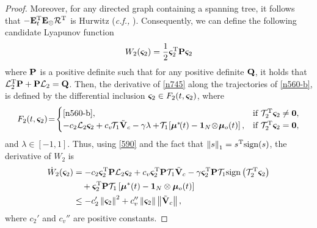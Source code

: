 \begin{proof}
	Moreover, for any directed graph containing a spanning tree, it follows that $-\mathbf{E}_t^{\mathrm{T}} \mathbf{E}_\odot \mathcal{R}^{\mathrm{T}}$ is Hurwitz (\emph{c.f.,} \cite{mukherjee_robustness_2018}).
	Consequently, we can define the following candidate Lyapunov function 
	\begin{equation}\label{n745}
	W_2(\bm{\varsigma}_2)=\frac{1}{2}\bm{\varsigma}_2^{\mathrm{T}} \mathbf{P}\bm{\varsigma}_2
	\end{equation}
	where $\mathbf{P}$ is a positive definite such that for any positive definite $\mathbf{Q}$, it holds that $\mathcal{L}_2^{\mathrm{T}} \mathbf{P} + \mathbf{P}\mathcal{L}_2=\mathbf{Q}$.
	Then, the derivative of \eqref{n745} along the trajectories of \eqref{n560-b}, is defined by the differential inclusion $\bm{\varsigma}_2\in F_2(t,\bm{\varsigma}_2)$, where
	\begin{equation*}
	F_2(t,\bs{\varsigma}_2)\!=\!\begin{cases}
	\eqref{n560-b},& \text{if } \mathcal{T}_2\T\bs{\varsigma}_2\neq \mat{0},\\
	-c_2\mathcal{L}_2\bs{\varsigma}_2+c_{v\!}\mathcal{T}_1\oceantilde-\gamma\lambda+\!\mathcal{T}_{1\!}\left[\bs{\mu}^*\!(t)-\mathbf{1}_{N}\!\otimes\!\bs{\mu}_o(t)\right],& \text{if } \mathcal{T}_2\T\bs{\varsigma}_2=\mat{0},
	\end{cases}
	\end{equation*}
	and $\lambda\in\left[-1,1\right]$.
	Thus, using \eqref{590} and the fact that $\left\|s\right\|_1 = s^{\mathrm{T}}{\rm sign}(s)$, the derivative of $W_2$ is
	\begin{align}
	\nonumber\dot W_2(\bm{\varsigma}_2) &=-c_2\bm{\varsigma}_2^{\mathrm{T}} \mathbf{P}\mathcal{L}_2\bm{\varsigma}_2+c_v\bm{\varsigma}_2^{\mathrm{T}} \mathbf{P}\mathcal{T}_1\tilde{\mathbf{V}}_c-\gamma\bm{\varsigma}_2^{\mathrm{T}} \mathbf{P}\mathcal{T}_1{\rm sign}\left(\mathcal{T}_2^{\mathrm{T}}\bm{\varsigma}_2\right)\\
	\nonumber&\quad +\bm{\varsigma}_2^{\mathrm{T}} \mathbf{P}\mathcal{T}_1\left[\bm{\mu}^*(t)-\mathbf{1}_{N}\otimes\bm{\mu}_o(t)\right]\\
	&\leq-c_2'\left\|\bm{\varsigma}_2\right\|^2+c_v''\left\|\bm{\varsigma}_2\right\|\left\|\tilde{\mathbf{V}}_c\right\|,\label{n775}
	\end{align}
	where $c_2'$ and $c_v''$ are positive constants.
	

\end{proof}
